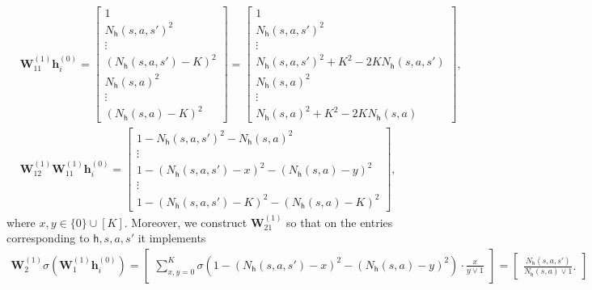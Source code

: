 \documentclass[10pt]{article}
\newcommand{\<}{\left\langle}
\renewcommand{\>}{\right\rangle}
\newcommand{\state}{{s}}
\newcommand{\action}{{a}}
\newcommand{\Numepi}{{K}}
\newcommand{\Numvi}{{N}}
\def\bW{{\mathbf W}}
\def\bh{{\mathbf h}}
\def\sh{{\mathsf{h}}}
\begin{document}
\begin{align*}
   & \bW^{(1)}_{11}\bh_i^{(0)}=     \begin{bmatrix}
    1\\
       \Numvi_\sh(\state,\action,\state')^2 \\\vdots
       \\
        (\Numvi_\sh(\state,\action,\state')-\Numepi)^2\\
         \Numvi_\sh(\state,\action)^2 \\\vdots
       \\
        (\Numvi_\sh(\state,\action)-\Numepi)^2
    \end{bmatrix}= \begin{bmatrix}
    1\\
       \Numvi_\sh(\state,\action,\state')^2 \\\vdots
       \\
        \Numvi_\sh(\state,\action,\state')^2+\Numepi^2-2\Numepi\Numvi_\sh(\state,\action,\state')\\
          \Numvi_\sh(\state,\action)^2 \\\vdots
       \\
        \Numvi_\sh(\state,\action)^2+\Numepi^2-2\Numepi\Numvi_\sh(\state,\action)
    \end{bmatrix},
    \\
&\bW^{(1)}_{12}\bW^{(1)}_{11}\bh_i^{(0)}=     \begin{bmatrix}
    1-
       \Numvi_\sh(\state,\action,\state')^2 - \Numvi_\sh(\state,\action)^2 \\\vdots
       \\ 1-
       (\Numvi_\sh(\state,\action,\state')-x)^2 - (\Numvi_\sh(\state,\action)-y)^2 \\\vdots\\
       1- (\Numvi_\sh(\state,\action,\state')-\Numepi)^2-(\Numvi_\sh(\state,\action)-\Numepi)^2
    \end{bmatrix} ,
\end{align*} where $x,y\in\{0\}\cup[\Numepi]$. Moreover,  we construct $\bW^{(1)}_{21}$ so that on the entries corresponding to $\sh,\state,\action,\state'$ it implements
\begin{align*}
\bW_{2}^{(1)}\sigma(\bW_{1}^{(1)}\bh_i^{(0)})
    =\begin{bmatrix}
        \sum_{x,y=0}^{\Numepi}\sigma(1- (\Numvi_\sh(\state,\action,\state')-x)^2 - (\Numvi_\sh(\state,\action)-y)^2)\cdot\frac{x}{y\vee1}
    \end{bmatrix}=\begin{bmatrix}
        \frac{\Numvi_\sh(\state,\action,\state')}{\Numvi_\sh(\state,\action)\vee1}.
    \end{bmatrix}
\end{align*}
\end{document}
